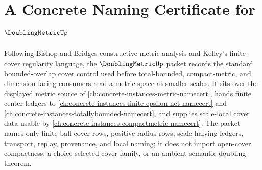 \chapter{A Concrete Naming Certificate for $\DoublingMetricUp$}
\label{ch:concrete-instances-doubling-metric-namecert}

Following Bishop and Bridges constructive metric analysis and Kelley's finite-cover regularity language, the $\DoublingMetricUp$ packet records the standard bounded-overlap cover control used before total-bounded, compact-metric, and dimension-facing consumers read a metric space at smaller scales. It sits over the displayed metric source of \autoref{ch:concrete-instances-metric-namecert}, hands finite center ledgers to \autoref{ch:concrete-instances-finite-epsilon-net-namecert} and \autoref{ch:concrete-instances-totallybounded-namecert}, and supplies scale-local cover data usable by \autoref{ch:concrete-instances-compactmetric-namecert}. The packet names only finite ball-cover rows, positive radius rows, scale-halving ledgers, transport, replay, provenance, and local naming; it does not import open-cover compactness, a choice-selected cover family, or an ambient semantic doubling theorem.

